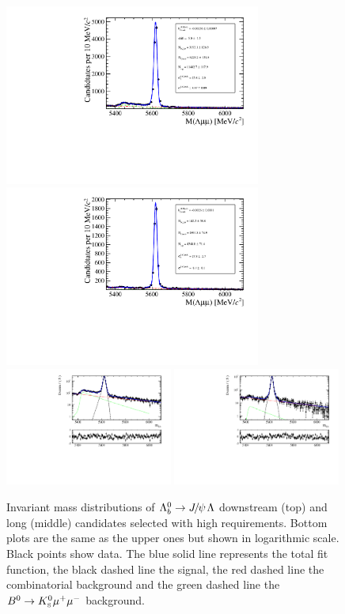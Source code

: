 \begin{figure}
\centering
\includegraphics[width=0.75\textwidth]{Lmumu/figs/MassFits/Lb2JpsiL__DD_data.pdf}
\includegraphics[width=0.75\textwidth]{Lmumu/figs/MassFits/Lb2JpsiL__LL_data.pdf}
\includegraphics[width=0.49\textwidth]{Lmumu/figs/MassFits/Lb2JpsiL_DD_data_log_fitAndRes.pdf}
\includegraphics[width=0.49\textwidth]{Lmumu/figs/MassFits/Lb2JpsiL_LL_data_log_fitAndRes.pdf}
\caption{Invariant mass distributions of $\Lb\ra\jpsi\Lz$ downstream (top) and long (middle) candidates
selected with high \qsq requirements.
Bottom plots are the same as the upper ones but shown in logarithmic scale. Black points show data.
The blue solid line represents the total fit function, the black dashed line the signal, the red dashed line
the combinatorial background and the green dashed line the $B^0\rightarrow K^0_{\rm\scriptscriptstyle S}\mu^+\mu^-$ background.}
\label{fig:Lb_totalFit}
\end{figure}
